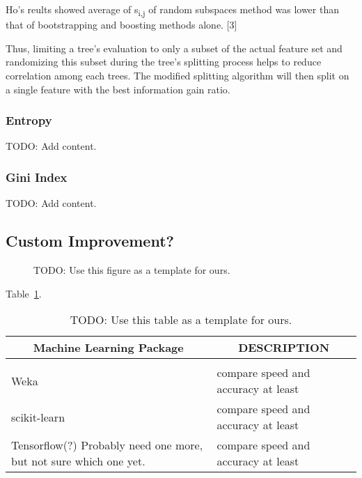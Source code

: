 \documentclass{article} %
\begin{document}
Ho's reults showed average of s\textsubscript{i,j} of random subspaces method was lower than that of bootstrapping and boosting methods alone. [3]

 Thus, limiting a tree's evaluation to only a subset of the actual feature set and  randomizing this subset during the tree's splitting  process helps to reduce correlation among each trees. The modified splitting algorithm will then split on a single feature with the best information gain ratio.

\subsubsection{Entropy}
TODO: Add content.

\subsubsection{Gini Index}
TODO: Add content.

\subsection{Custom Improvement?}



\begin{figure}[h]
\begin{center}
\fbox{\rule[-.5cm]{0cm}{4cm} \rule[-.5cm]{4cm}{0cm}}
\end{center}
\caption{TODO: Use this figure as a template for ours.}
\end{figure}

Table~\ref{sample-table}.

\begin{table}[t]
\caption{TODO: Use this table as a template for ours.}
\label{sample-table}
\begin{center}
\begin{tabular}{ll}
\multicolumn{1}{c}{\bf Machine Learning Package} &\multicolumn{1}{c}{\bf DESCRIPTION}
\\ \hline \\
Weka         &compare speed and accuracy at least \\
scikit-learn             &compare speed and accuracy at least \\
Tensorflow(?) Probably need one more, but not sure which one yet.             &compare speed and accuracy at least \\
\end{tabular}
\end{center}
\end{table}
\end{document}
